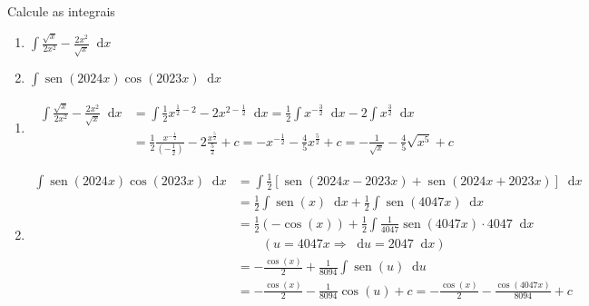 \documentclass[12pt,a4paper]{article}
\newcommand*\diff{\mathop{}\!\mathrm{d}}
\newcommand*\sen{\operatorname{sen}}
\begin{document}
\begin{ExerciseList}
\Exercise[title={2,0}] Calcule as integrais
\begin{multicols}{2}
    \begin{enumerate}
        \item $\displaystyle\int \frac{\sqrt{x}}{2x^2} - \frac{2x^2}{\sqrt{x}} \diff{x}$
        \item $\displaystyle\int \sen(2024 x) \cos(2023 x) \diff{x}$
    \end{enumerate}
\end{multicols}
\Answer
\begin{enumerate}
\item
\begin{align*}
    \int \frac{\sqrt{x}}{2x^2} - \frac{2x^2}{\sqrt{x}} \diff{x}
    & = \int \frac{1}{2}x^{\frac{1}{2} - 2} - 2 x^{2-\frac{1}{2}} \diff{x}
      = \frac{1}{2} \int x^{-\frac{3}{2}} \diff{x} - 2 \int x^{\frac{3}{2}} \diff{x} \\
    & = \frac{1}{2} \frac{x^{-\frac{1}{2}}}{(-\frac{1}{2})} - 2 \frac{x^{\frac{5}{2}}}{\frac{5}{2}} + c
      = - x^{-\frac{1}{2}} - \frac{4}{5} x^{\frac{5}{2}} + c
      = -\frac{1}{\sqrt{x}} - \frac{4}{5} \sqrt{x^5} + c
\end{align*}

\item
\begin{align*}
    \int \sen(2024 x) \cos(2023 x) \diff{x}
    & = \int \frac{1}{2}\left[ \sen(2024 x - 2023 x) + \sen(2024 x + 2023 x)\right] \diff{x} \\
    & = \frac{1}{2} \int \sen(x) \diff{x} + \frac{1}{2} \int \sen(4047 x) \diff{x} \\
    & = \frac{1}{2} (-\cos(x))  + \frac{1}{2} \int \frac{1}{4047} \sen(4047 x) \cdot 4047 \diff{x} \\
    & \quad \quad (u = 4047 x\Rightarrow \diff{u} = 2047 \diff{x}) \\
    & = -\frac{\cos(x)}{2}  + \frac{1}{8094} \int \sen(u) \diff{u} \\
    & = -\frac{\cos(x)}{2} -\frac{1}{8094} \cos(u) + c
      = -\frac{\cos(x)}{2} -\frac{\cos(4047 x)}{8094} + c
\end{align*}
\end{enumerate}


\end{ExerciseList}
\end{document}
